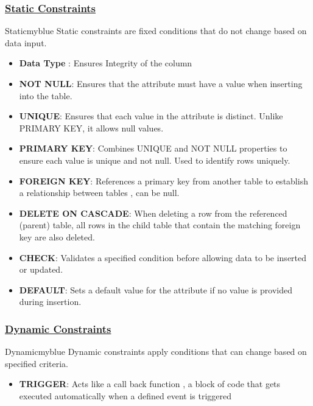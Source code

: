 \subsubsection{\underline{Static Constraints}}

\vspace{0.25cm}
\begin{prettyBox}{Static}{myblue}
Static constraints are fixed conditions that do not change based on data input.
\begin{itemize} 
\item \textbf{Data Type} : Ensures Integrity of the column
\item \textbf{NOT NULL}: Ensures that the attribute must have a value when inserting into the table.
\item \textbf{UNIQUE}: Ensures that each value in the attribute is distinct. Unlike PRIMARY KEY, it allows null values.
\item \textbf{PRIMARY KEY}: Combines UNIQUE and NOT NULL properties to ensure each value is unique and not null.
Used to identify rows uniquely. 
\item \textbf{FOREIGN KEY}: References a primary key from another table to establish a relationship between tables , can be null.
\item \textbf{DELETE ON CASCADE}: When deleting a row from the referenced (parent) table, all rows in the child table 
that contain the matching foreign key are also deleted.
\item \textbf{CHECK}: Validates a specified condition before allowing data to be inserted or updated. 
\item \textbf{DEFAULT}: Sets a default value for the attribute if no value is provided during insertion. 
\end{itemize}
\end{prettyBox}

\vspace{0.5cm}
\subsubsection{\underline{Dynamic Constraints}} 

\vspace{0.25cm}
\begin{prettyBox}{Dynamic}{myblue}
Dynamic constraints apply conditions that can change based on specified criteria.
\begin{itemize} 
\item \textbf{TRIGGER}: Acts like a call back function , a block of code that gets executed automatically when 
a defined event is triggered
\end{itemize}
\end{prettyBox}

